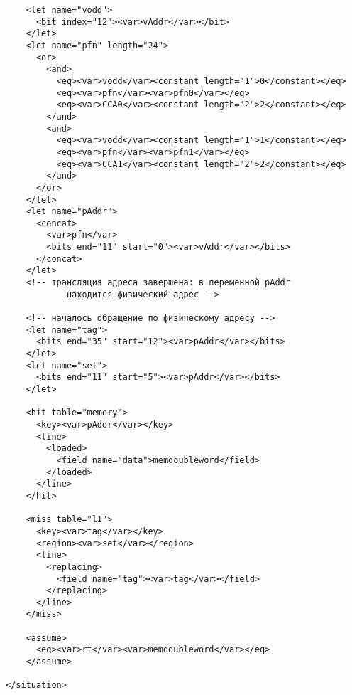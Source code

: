 \begin{verbatim}
    <let name="vodd">
      <bit index="12"><var>vAddr</var></bit>
    </let>
    <let name="pfn" length="24">
      <or>
        <and>
          <eq><var>vodd</var><constant length="1">0</constant></eq>
          <eq><var>pfn</var><var>pfn0</var></eq>
          <eq><var>CCA0</var><constant length="2">2</constant></eq>
        </and>
        <and>
          <eq><var>vodd</var><constant length="1">1</constant></eq>
          <eq><var>pfn</var><var>pfn1</var></eq>
          <eq><var>CCA1</var><constant length="2">2</constant></eq>
        </and>
      </or>
    </let>
    <let name="pAddr">
      <concat>
        <var>pfn</var>
        <bits end="11" start="0"><var>vAddr</var></bits>
      </concat>
    </let>
    <!-- трансляция адреса завершена: в переменной pAddr
            находится физический адрес -->

    <!-- началось обращение по физическому адресу -->
    <let name="tag">
      <bits end="35" start="12"><var>pAddr</var></bits>
    </let>
    <let name="set">
      <bits end="11" start="5"><var>pAddr</var></bits>
    </let>

    <hit table="memory">
      <key><var>pAddr</var></key>
      <line>
        <loaded>
          <field name="data">memdoubleword</field>
        </loaded>
      </line>
    </hit>

    <miss table="l1">
      <key><var>tag</var></key>
      <region><var>set</var></region>
      <line>
        <replacing>
          <field name="tag"><var>tag</var></field>
        </replacing>
      </line>
    </miss>

    <assume>
      <eq><var>rt</var><var>memdoubleword</var></eq>
    </assume>

</situation>
\end{verbatim} 